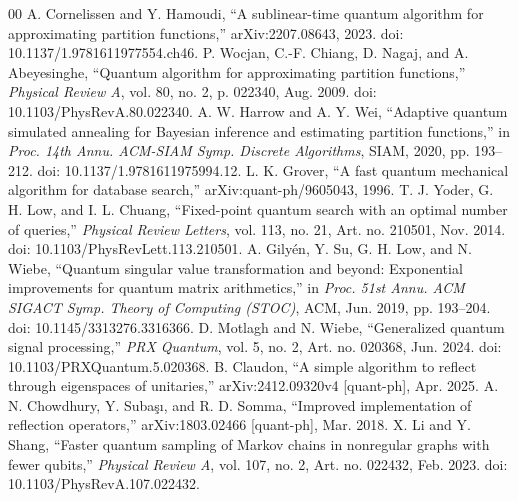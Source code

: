 \documentclass[10pt,conference]{IEEEtran}
\providecommand{\href}[2]{#2}
\theoremstyle{plain}
\theoremstyle{remark}
\begin{document}
\begin{thebibliography}{00}
 A. Cornelissen and Y. Hamoudi, ``A sublinear-time quantum algorithm for approximating partition functions,'' arXiv:\href{https://arxiv.org/abs/2207.08643}{2207.08643}, 2023. doi: \href{https://doi.org/10.1137/1.9781611977554.ch46}{10.1137/1.9781611977554.ch46}.
 P. Wocjan, C.-F. Chiang, D. Nagaj, and A. Abeyesinghe, ``Quantum algorithm for approximating partition functions,'' \emph{Physical Review A}, vol. 80, no. 2, p. 022340, Aug. 2009. doi: \href{https://doi.org/10.1103/PhysRevA.80.022340}{10.1103/PhysRevA.80.022340}.
 A. W. Harrow and A. Y. Wei, ``Adaptive quantum simulated annealing for Bayesian inference and estimating partition functions,'' in \emph{Proc. 14th Annu. ACM-SIAM Symp. Discrete Algorithms}, SIAM, 2020, pp. 193--212. doi: \href{https://doi.org/10.1137/1.9781611975994.12}{10.1137/1.9781611975994.12}.
 L. K. Grover, ``A fast quantum mechanical algorithm for database search,'' arXiv:\href{https://arxiv.org/abs/quant-ph/9605043}{quant-ph/9605043}, 1996.
 T. J. Yoder, G. H. Low, and I. L. Chuang, ``Fixed-point quantum search with an optimal number of queries,'' \emph{Physical Review Letters}, vol. 113, no. 21, Art. no. 210501, Nov. 2014. doi: \href{https://doi.org/10.1103/PhysRevLett.113.210501}{10.1103/PhysRevLett.113.210501}.
 A. Gily\'en, Y. Su, G. H. Low, and N. Wiebe, ``Quantum singular value transformation and beyond: Exponential improvements for quantum matrix arithmetics,'' in \emph{Proc. 51st Annu. ACM SIGACT Symp. Theory of Computing (STOC)}, ACM, Jun. 2019, pp. 193--204. doi: \href{https://doi.org/10.1145/3313276.3316366}{10.1145/3313276.3316366}.
 D. Motlagh and N. Wiebe, ``Generalized quantum signal processing,'' \emph{PRX Quantum}, vol. 5, no. 2, Art. no. 020368, Jun. 2024. doi: \href{https://doi.org/10.1103/PRXQuantum.5.020368}{10.1103/PRXQuantum.5.020368}.
 B. Claudon, ``A simple algorithm to reflect through eigenspaces of unitaries,'' arXiv:\href{https://arxiv.org/abs/2412.09320v4}{2412.09320v4} [quant-ph], Apr. 2025.
 A. N. Chowdhury, Y. Suba\c{s}\i, and R. D. Somma, ``Improved implementation of reflection operators,'' arXiv:\href{https://arxiv.org/abs/1803.02466}{1803.02466} [quant-ph], Mar. 2018.
 X. Li and Y. Shang, ``Faster quantum sampling of Markov chains in nonregular graphs with fewer qubits,'' \emph{Physical Review A}, vol. 107, no. 2, Art. no. 022432, Feb. 2023. doi: \href{https://doi.org/10.1103/PhysRevA.107.022432}{10.1103/PhysRevA.107.022432}.

\end{thebibliography}
\end{document}
